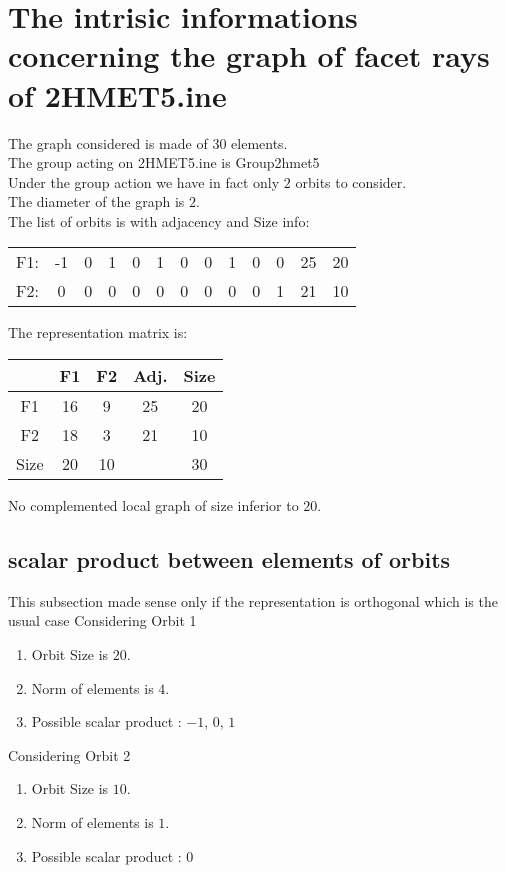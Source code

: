 \documentclass[12pt]{article}
\begin{document}
\section{The intrisic informations concerning the graph of facet rays of 2HMET5.ine}
The graph considered is made of $30$ elements.\\
The group acting on 2HMET5.ine is Group2hmet5\\
Under the group action we have in fact only $2$ orbits to consider.\\
The diameter of the graph is $2$.\\
The list of orbits is with adjacency and Size info:
\begin{center}
\scriptsize
\begin{tabular}{ccccccccccc|c|c}
F1:&-1&0&1&0&1&0&0&1&0&0&25&20\\
F2:&0&0&0&0&0&0&0&0&0&1&21&10\\
\end{tabular}
\end{center}
The representation matrix is:
\begin{center}
\scriptsize
\begin{tabular}{|c|cc|c|c|}
\hline
&F1&F2&Adj.&Size\\
\hline
F1& 16& 9&25&20\\
F2& 18& 3&21&10\\
\hline
Size&20&10&&30\\
\hline
\end{tabular}
\end{center}
No complemented local graph of size inferior to $20$.
\subsection{scalar product between elements of orbits}
\noindent This subsection made sense only if the representation is orthogonal which is the usual case
Considering Orbit 1
\begin{enumerate}
\item Orbit Size is $20$.
\item Norm of elements is $4$.
\item Possible scalar product : $-1$, $0$, $1$
\end{enumerate}
Considering Orbit 2
\begin{enumerate}
\item Orbit Size is $10$.
\item Norm of elements is $1$.
\item Possible scalar product : $0$
\end{enumerate}
\end{document}
